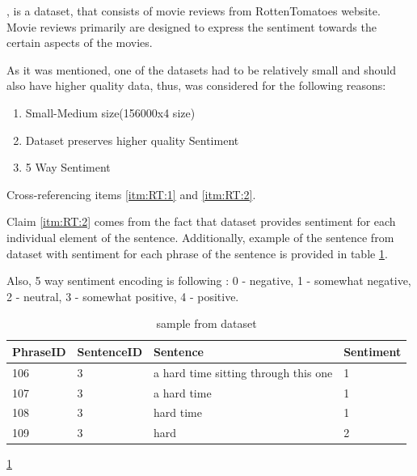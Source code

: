 \documentclass[conference]{IEEEtran}
\begin{document}
			\RT, is a dataset, that consists of movie reviews from RottenTomatoes website. Movie reviews primarily are designed to express the sentiment towards the certain aspects of the movies. 
			
			As it was mentioned, one of the datasets had to be relatively small and should also have higher quality data, thus, \RT\cite{dataset:RT} was considered for the following reasons:

			\begin{enumerate}
				\item \label{itm:RT:1} Small-Medium size(156000x4 size)
				\item \label{itm:RT:2} Dataset preserves higher quality Sentiment 
				\item \label{itm:RT:3} 5 Way Sentiment
			\end{enumerate}
			Cross-referencing items \ref{itm:RT:1} and \ref{itm:RT:2}.
			
			Claim \ref{itm:RT:2} comes from the fact that dataset provides sentiment for each individual element of the sentence. Additionally, example of the sentence from dataset with sentiment for each phrase of the sentence is provided in table \ref{table:1}.
			
			Also, 5 way sentiment encoding is following : 0 - negative, 1 - somewhat negative, 2 - neutral, 3 - somewhat positive, 4 - positive.
			
			
			\begin{table}
				\centering
				\begin{tabular}{ | m{2cm} | m{2cm}| m{5em} | m{2cm} | } 
					\hline
					PhraseID & SentenceID & Sentence & Sentiment \\ %
					\hline
					106 & 3 & a hard time sitting through this one & 1 \\ 
					\hline
					107 & 3 & a hard time & 1 \\
					\hline
					108 & 3 & hard time & 1 \\
					\hline
					109 & 3 & hard & 2 \\ [1ex]
					\hline
				\end{tabular}
				\caption{sample from dataset \RT}
				\label{table:1}
				\ref{table:1}
			\end{table}
		
		
		\subsubsection{\TW\cite{dataset:TW}}
			
\end{document}
